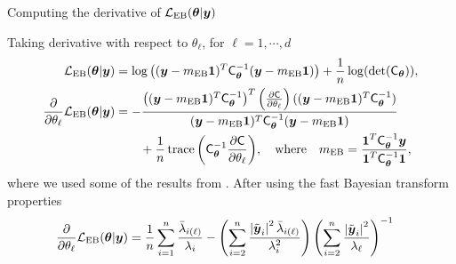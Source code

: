 \documentclass[handout, 10pt,compress,xcolor={usenames,dvipsnames}]{beamer} %
\newcommand{\bm}[1]{\boldsymbol{#1}}
\newcommand{\smallcite}[1]{{\small\cite{#1}}}
\newcommand{\MLE}{\textup{EB}}
\newcommand{\mCthetaInv}{{\mathsf{C}^{-1}_{\vtheta}}}
\renewcommand{\vtheta}{{\bm{\theta}}}
\def\abs#1{\ensuremath{\left \lvert #1 \right \rvert}}
\begin{document}
\begin{frame}{Computing the derivative of $\mathcal{L}_{\MLE}(\vtheta | \vy)$}
	
	Taking derivative with respect to $\theta_\ell$, for $\ell=1,\cdots,d$
	\begin{align*}
	\mathcal{L}_{\MLE}(\vtheta | \vy)
	& = \log\left( {(\vy-m_\MLE\vone)^T\mCthetaInv(\vy-m_\MLE\vone)} \right) + \frac{1}{n} \log(\det(\mC_\vtheta)),
	\\
	\frac{\partial}{\partial \theta_\ell} \mathcal{L}_{\MLE}(\vtheta | \vy)
	& = - \frac
	{\left((\vy-m_\MLE\vone)^T\mCthetaInv\right)^T 
		\left( \frac{\partial \mC}{\partial \theta_\ell} \right)
		((\vy-m_\MLE\vone)^T\mCthetaInv)}
	{(\vy-m_\MLE\vone)^T\mCthetaInv(\vy-m_\MLE\vone)}
	\\ & \qquad
	+ \frac 1n \trace{\left( \mCthetaInv \frac{\partial \mC}{\partial \theta_\ell} \right)}
	, \quad \text{where} \quad m_\MLE = \frac{\vone^T \mCthetaInv \vy }{ \vone^T \mCthetaInv \vone}, 
	\end{align*}
	where we used some of the results from \smallcite{Dong2017a}.  After using the fast Bayesian transform properties
	\begin{align}
	\label{eqn:deriv_obj_func_MLE}
	\frac{\partial}{\partial \theta_\ell} \mathcal{L}_{\MLE}(\vtheta | \vy)
	&=  \frac 1n \sum_{i=1}^{n} \frac{\bar{\lambda}_{i(\ell)}}{\lambda_i}
	- \left({ \sum_{i=2}^n \frac{\abs{\tvy_i}^2 \bar{\lambda}_{i(\ell)}}{\lambda_i^2}}\right)
	\left( {\sum_{i=2}^n \frac{\abs{\tvy_i}^2}{\lambda_\ell}} \right)^{-1}
	\end{align}
	
\end{frame}
\end{document}
